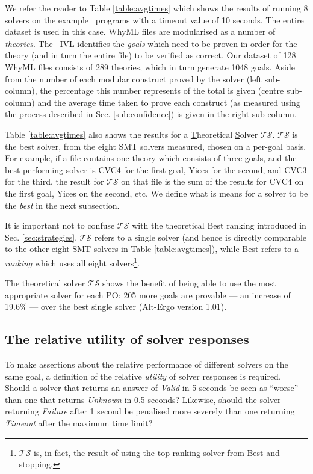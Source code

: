 We refer the reader to Table \ref{table:avgtimes} which shows the results of running 8 solvers on the example \why~programs with a timeout value of 10 seconds. 
The entire dataset is used in this case. 
WhyML files are modularised as a number of \textit{theories}. The \why~IVL identifies the \textit{goals} which need to be proven in order for the theory (and in turn the entire file) to be verified as correct. 
Our dataset of 128 WhyML files consists of 289 theories, which in turn generate 1048 goals. 
Aside from the number of each modular construct proved by the solver (left sub-column), the percentage this number represents of the total is given (centre sub-column) and the average time taken to prove each construct (as measured using the process described in Sec. \ref{sub:confidence}) is given in the right sub-column. 

Table \ref{table:avgtimes} also shows the results for a \underline{T}heoretical \underline{S}olver $ \mathcal{TS} $. 
$ \mathcal{TS} $ is the best solver, from the eight SMT solvers measured, chosen on a per-goal basis. 
For example, if a file contains one theory which consists of three goals, and the best-performing solver is CVC4 for the first goal, Yices for the second, and CVC3 for the third, the result for $\mathcal{TS}$ on that file is the sum of the results for CVC4 on the first goal, Yices on the second, etc.
We define what is means for a solver to be the \textit{best} in the next subsection.

It is important not to confuse $\mathcal{TS}$ with the theoretical \textsf{Best} ranking introduced in Sec. \ref{sec:strategies}. 
$\mathcal{TS}$ refers to a single solver (and hence is directly comparable to the other eight SMT solvers in Table \ref{table:avgtimes}), while \textsf{Best} refers to a \textit{ranking} which uses all eight solvers\footnote{$\mathcal{TS}$ is, in fact, the result of using the top-ranking solver from \textsf{Best} and stopping.}.


The theoretical solver $\mathcal{TS}$ shows the benefit of being able to use the most appropriate solver for each PO: 205 more goals are provable --- an increase of 19.6\% --- over the best single solver (Alt-Ergo version 1.01). 

\subsection{The relative utility of solver responses}

To make assertions about the relative performance of different solvers on the same goal, a definition of the relative \textit{utility} of solver responses is required.
Should a solver that returns an answer of \textit{Valid} in 5 seconds be seen as ``worse'' than one that returns \textit{Unknown} in 0.5 seconds? 
Likewise, should the solver returning \textit{Failure} after 1 second be penalised more severely than one returning \textit{Timeout} after the maximum time limit?

